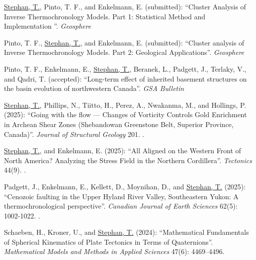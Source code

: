 \documentclass[10pt, paper=letter]{scrartcl} %
\begin{document}
\begin{cv}{}
\begin{cvlist}{}
        \item[-] \ul{Stephan, T.}, Pinto, T. F., and Enkelmann, E. (submitted): \enquote{Cluster Analysis of Inverse Thermochronology Models. Part 1: Statistical Method and Implementation }. \textit{Geosphere}
        
        \item[-] Pinto, T. F., \ul{Stephan, T.}, and Enkelmann, E. (submitted): \enquote{Cluster analysis of Inverse Thermochronology Models. Part 2: Geological Applications}.  \textit{Geosphere}

        \item[17] Pinto, T. F., Enkelmann, E., \ul{Stephan, T.}, Beranek, L., Padgett, J., Terlaky, V., and Qadri, T. (accepted): \enquote{Long-term effect of inherited basement structures on the basin evolution of northwestern Canada}. \textit{GSA Bulletin}

        \item[16] \ul{Stephan, T.}, Phillips, N., Tiitto, H., Perez, A., Nwakanma, M., and Hollings, P. (2025): \enquote{Going with the flow --- Changes of  Vorticity Controls Gold Enrichment in Archean Shear Zones (Shebandowan Greenstone Belt, Superior Province, Canada)}. \textit{Journal of Structural Geology} 201. .

        \item[15] \ul{Stephan, T.}, and Enkelmann, E. (2025): \enquote{All Aligned on the Western Front of North America? Analyzing the Stress Field in the Northern Cordillera}. \textit{Tectonics} 44(9). .

        \item[14] Padgett, J., Enkelmann, E., Kellett, D., Moynihan, D., and \ul{Stephan, T.} (2025): \enquote{Cenozoic faulting in the Upper Hyland River Valley, Southeastern Yukon: A thermochronological perspective}. \textit{Canadian Journal of Earth Sciences} 62(5): 1002-1022. .

        \item[13] Schaeben, H., Kroner, U., and \ul{Stephan, T.} (2024): \enquote{Mathematical Fundamentals of Spherical Kinematics of Plate Tectonics in Terms of Quaternions}. \textit{Mathematical Models and Methods in Applied Sciences} 47(6): 4469--4496. 


\end{cvlist}
\end{cv}
\end{document}
